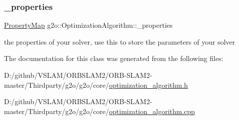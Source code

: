 \subsubsection{\texorpdfstring{\+\_\+properties}{\_properties}}
{\footnotesize\ttfamily \mbox{\hyperlink{classg2o_1_1_property_map}{Property\+Map}} g2o\+::\+Optimization\+Algorithm\+::\+\_\+properties\hspace{0.3cm}{\ttfamily [protected]}}



the properties of your solver, use this to store the parameters of your solver 



The documentation for this class was generated from the following files\+:\begin{DoxyCompactItemize}
\item 
D\+:/github/\+V\+S\+L\+A\+M/\+O\+R\+B\+S\+L\+A\+M2/\+O\+R\+B-\/\+S\+L\+A\+M2-\/master/\+Thirdparty/g2o/g2o/core/\mbox{\hyperlink{optimization__algorithm_8h}{optimization\+\_\+algorithm.\+h}}\item 
D\+:/github/\+V\+S\+L\+A\+M/\+O\+R\+B\+S\+L\+A\+M2/\+O\+R\+B-\/\+S\+L\+A\+M2-\/master/\+Thirdparty/g2o/g2o/core/\mbox{\hyperlink{optimization__algorithm_8cpp}{optimization\+\_\+algorithm.\+cpp}}\end{DoxyCompactItemize}

